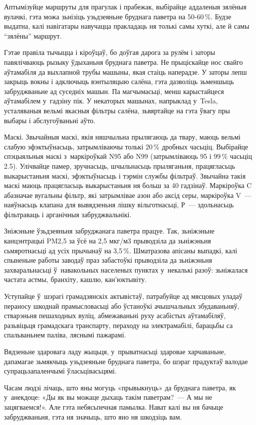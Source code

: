Аптымізуйце маршруты для прагулак і прабежак, выбірайце аддаленыя зялёныя вулачкі, гэта можа зьнізіць узьдзеяньне бруднага паветра на 50-60\,\%. Будзе выдатна, калі навігатары навучацца пракладаць ня толькі самы хуткі, але й самы ``зялёны'' маршрут.

Гэтае правіла тычыцца і кіроўцаў, бо доўгая дарога за рулём і заторы павялічваюць рызыку ўдыханьня бруднага паветра. Не прыціскайце нос свайго аўтамабіля да выхлапной трубы машыны, якая стаіць наперадзе. У заторы лепш закрыць вокны і адключыць вэнтыляцыю салёна, гэта дазволіць зьменшыць забруджваньне ад суседніх машын. Па магчымасьці, менш карыстайцеся аўтамабілем у~гадзіну пік. У некаторых машынах, напрыклад у~Tesla, усталяваныя вельмі якасныя фільтры салёна, зьвяртайце на гэта ўвагу пры выбары і абслугоўваньні аўто.

Маскі. Звычайныя маскі, якія няшчыльна прылягаюць да твару, маюць вельмі слабую эфэктыўнасьць, затрымліваючы толькі 20\,\% дробных часьціц. Выбірайце спэцыяльныя маскі з~маркіроўкай N95 або N99 (затрымліваюць 95 і 99\,\% часьціц 2.5). Улічвайце памер, зручнасьць, шчыльнасьць прыляганьня, працягласьць выкарыстаньня маскі, эфэктыўнасьць і тэрмін службы фільтраў. Звычайна такія маскі маюць працягласьць выкарыстаньня ня больш за 40 гадзінаў. Маркіроўка C абазначае вугальны фільтр, які затрымлівае азон або аксід серы, маркіроўка V~--- наяўнасьць клапана для вывядзеньня лішку вільготнасьці, Р~--- здольнасьць фільтраваць і арганічныя забруджвальнікі.

Зніжэньне ўзьдзеяньня забруджанага паветра працуе. Так, зьніжэньне канцэнтрацыі PM2,5 за ўсё на 2,5 мкг/м3 прыводзіла да зьніжэньня сьмяротнасьці ад усіх прычынаў на 3,5\,\%. Шматразова апісаны выпадкі, калі спыненьне работы заводаў праз забастоўкі прыводзіла да зьніжэньня захваральнасьці ў~навакольных населеных пунктах у~некалькі разоў: зьніжалася частата астмы, бранхіту, кашлю, кан'юктывіту.

Уступайце ў~шэрагі грамадзянскіх актывістаў, патрабуйце ад мясцовых уладаў пераносу шкоднай прамысловасьці або ўстаноўкі ачышчальных збудаваньняў, стварэньня пешаходных вуліц, абмежаваньні руху асабістых аўтамабіляў, разьвіцьця грамадскага транспарту, пераходу на электрамабілі, барацьбы са спальваньнем паліва, ляснымі пажарамі.

Вядзеньне здаровага ладу жыцьця, у~прыватнасьці здаровае харчаваньне, дапамагае зьмякчыць узьдзеяньне бруднага паветра, бо шэраг прадуктаў валодае супрацьзапаленчымі ўласьцівасьцямі.

Часам людзі лічаць, што яны могуць «прывыкнуць» да бруднага паветра, як у~анекдоце: «Ды як вы можаце дыхаць такім паветрам?~--- А мы не зацягваемся!». Але гэта небясьпечная памылка. Нават калі вы ня бачыце забруджваньня, гэта ня значыць, што яно ня шкодзіць вам.

